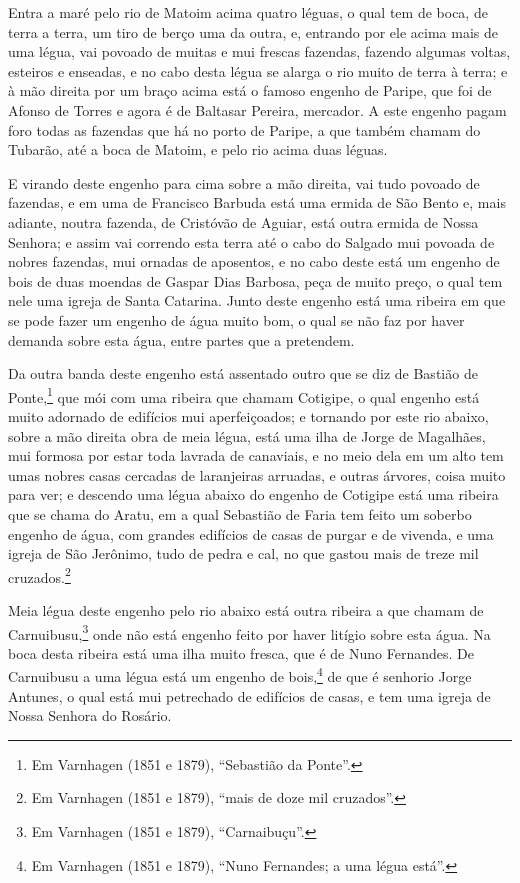Entra a maré pelo rio de Matoim acima quatro léguas, o qual tem de boca, de terra a terra,
um tiro de berço uma da outra, e, entrando por ele acima mais de uma légua, vai povoado de
muitas e mui frescas fazendas, fazendo algumas voltas, esteiros e enseadas, e no cabo
desta légua se alarga o rio muito de terra à terra; e à mão direita por um braço acima
está o famoso engenho de Paripe, que foi de Afonso de Torres e agora é de Baltasar
Pereira, mercador. A este engenho pagam foro todas as fazendas que há no porto de Paripe,
a que também chamam do Tubarão, até a boca de Matoim, e pelo rio acima duas léguas.

E virando deste engenho para cima sobre a mão direita, vai tudo povoado de fazendas, e em
uma de Francisco Barbuda está uma ermida de São Bento e, mais adiante, noutra fazenda, de
Cristóvão de Aguiar, está outra ermida de Nossa Senhora; e assim vai correndo esta terra
até o cabo do Salgado mui povoada de nobres fazendas, mui ornadas de aposentos, e no cabo
deste está um engenho de bois de duas moendas de Gaspar Dias Barbosa, peça de muito preço,
o qual tem nele uma igreja de Santa Catarina. Junto deste engenho está uma ribeira em que
se pode fazer um engenho de água muito bom, o qual se não faz por haver demanda sobre esta
água, entre partes que a pretendem.

Da outra banda deste engenho está assentado outro que se diz de Bastião de
Ponte,\footnote{ Em Varnhagen (1851 e 1879), ``Sebastião da Ponte''.} que mói com uma
ribeira que chamam Cotigipe, o qual engenho está muito adornado de edifícios mui
aperfeiçoados; e tornando por este rio abaixo, sobre a mão direita obra de meia légua,
está uma ilha de Jorge de Magalhães, mui formosa por estar toda lavrada de canaviais, e no
meio dela em um alto tem umas nobres casas cercadas de laranjeiras arruadas, e outras
árvores, coisa muito para ver; e descendo uma légua abaixo do engenho de Cotigipe está uma
ribeira que se chama do Aratu, em a qual Sebastião de Faria tem feito um soberbo engenho
de água, com grandes edifícios de casas de purgar e de vivenda, e uma igreja de São
Jerônimo, tudo de pedra e cal, no que gastou mais de treze mil cruzados.\footnote{ Em
Varnhagen (1851 e 1879), ``mais de doze mil cruzados''.}

Meia légua deste engenho pelo rio abaixo está outra ribeira a que chamam de
Carnuibusu,\footnote{ Em Varnhagen (1851 e 1879), ``Carnaibuçu''.} onde não está engenho
feito por haver litígio sobre esta água. Na boca desta ribeira está uma ilha muito fresca,
que é de Nuno Fernandes. De Carnuibusu a uma légua está um engenho de bois,\footnote{ Em
Varnhagen (1851 e 1879), ``Nuno Fernandes; a uma légua está''.} de que é senhorio Jorge
Antunes, o qual está mui petrechado de edifícios de casas, e tem uma igreja de Nossa
Senhora do Rosário.

